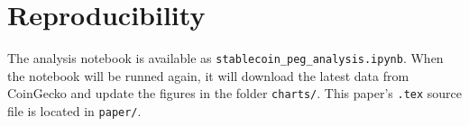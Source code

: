 \documentclass[conference]{IEEEtran}
\begin{document}
\section*{Reproducibility}
The analysis notebook is available as \texttt{stablecoin\_peg\_analysis.ipynb}. When the notebook will be runned again, it will download the latest data from CoinGecko and update the figures in the folder \texttt{charts/}. This paper's \texttt{.tex} source file is located in \texttt{paper/}.


\end{document}
